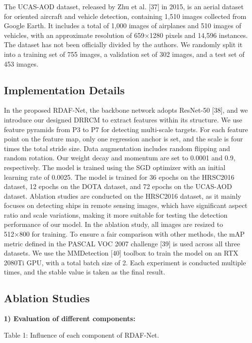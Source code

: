 \documentclass[10pt,twocolumn,final]{article}
\begin{document}
The UCAS-AOD dataset, released by Zhu et al. [37] in 2015, is an aerial dataset for oriented aircraft and vehicle detection, containing 1,510 images collected from Google Earth. It includes a total of 1,000 images of airplanes and 510 images of vehicles, with an approximate resolution of 659×1280 pixels and 14,596 instances. The dataset has not been officially divided by the authors. We randomly split it into a training set of 755 images, a validation set of 302 images, and a test set of 453 images.

\subsection{ Implementation Details }

In the proposed RDAF-Net, the backbone network adopts ResNet-50 [38], and we introduce our designed DRRCM to extract features within its structure. We use feature pyramids from P3 to P7 for detecting multi-scale targets. For each feature point on the feature map, only one regression anchor is set, and the scale is four times the total stride size. Data augmentation includes random flipping and random rotation. Our weight decay and momentum are set to 0.0001 and 0.9, respectively. The model is trained using the SGD optimizer with an initial learning rate of 0.0025. The model is trained for 36 epochs on the HRSC2016 dataset, 12 epochs on the DOTA dataset, and 72 epochs on the UCAS-AOD dataset. Ablation studies are conducted on the HRSC2016 dataset, as it mainly focuses on detecting ships in remote sensing images, which have significant aspect ratio and scale variations, making it more suitable for testing the detection performance of our model. In the ablation study, all images are resized to 512×800 for training. To ensure a fair comparison with other methods, the mAP metric defined in the PASCAL VOC 2007 challenge [39] is used across all three datasets. We use the MMDetection [40] toolbox to train the model on an RTX 2080Ti GPU, with a total batch size of 2. Each experiment is conducted multiple times, and the stable value is taken as the final result.

\subsection{ Ablation Studies }

\textbf{1) Evaluation of different components:}

Table 1: Influence of each component of RDAF-Net.
\end{document}
